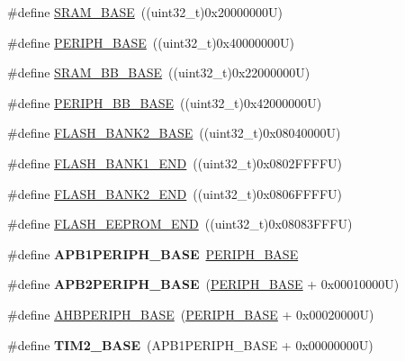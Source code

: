 \begin{DoxyCompactItemize}
\item 
\#define \hyperlink{group___peripheral__memory__map_ga05e8f3d2e5868754a7cd88614955aecc}{S\-R\-A\-M\-\_\-\-B\-A\-S\-E}~((uint32\-\_\-t)0x20000000\-U)
\item 
\#define \hyperlink{group___peripheral__memory__map_ga9171f49478fa86d932f89e78e73b88b0}{P\-E\-R\-I\-P\-H\-\_\-\-B\-A\-S\-E}~((uint32\-\_\-t)0x40000000\-U)
\item 
\#define \hyperlink{group___peripheral__memory__map_gad3548b6e2f017f39d399358f3ac98454}{S\-R\-A\-M\-\_\-\-B\-B\-\_\-\-B\-A\-S\-E}~((uint32\-\_\-t)0x22000000\-U)
\item 
\#define \hyperlink{group___peripheral__memory__map_gaed7efc100877000845c236ccdc9e144a}{P\-E\-R\-I\-P\-H\-\_\-\-B\-B\-\_\-\-B\-A\-S\-E}~((uint32\-\_\-t)0x42000000\-U)
\item 
\#define \hyperlink{group___peripheral__memory__map_ga289057b052162696849fef25b656d3d9}{F\-L\-A\-S\-H\-\_\-\-B\-A\-N\-K2\-\_\-\-B\-A\-S\-E}~((uint32\-\_\-t)0x08040000\-U)
\item 
\#define \hyperlink{group___peripheral__memory__map_ga443a2786535d83e32dfdc2b29e379332}{F\-L\-A\-S\-H\-\_\-\-B\-A\-N\-K1\-\_\-\-E\-N\-D}~((uint32\-\_\-t)0x0802\-F\-F\-F\-F\-U)
\item 
\#define \hyperlink{group___peripheral__memory__map_gab24a21b645aaab8737af5603c3d11e71}{F\-L\-A\-S\-H\-\_\-\-B\-A\-N\-K2\-\_\-\-E\-N\-D}~((uint32\-\_\-t)0x0806\-F\-F\-F\-F\-U)
\item 
\#define \hyperlink{group___peripheral__memory__map_gac8cb9b66893a7c4bdff3258909af027a}{F\-L\-A\-S\-H\-\_\-\-E\-E\-P\-R\-O\-M\-\_\-\-E\-N\-D}~((uint32\-\_\-t)0x08083\-F\-F\-F\-U)
\item 
\hypertarget{group___peripheral__memory__map_ga45666d911f39addd4c8c0a0ac3388cfb}{\#define {\bfseries A\-P\-B1\-P\-E\-R\-I\-P\-H\-\_\-\-B\-A\-S\-E}~\hyperlink{group___peripheral__memory__map_ga9171f49478fa86d932f89e78e73b88b0}{P\-E\-R\-I\-P\-H\-\_\-\-B\-A\-S\-E}}\label{group___peripheral__memory__map_ga45666d911f39addd4c8c0a0ac3388cfb}

\item 
\hypertarget{group___peripheral__memory__map_ga25b99d6065f1c8f751e78f43ade652cb}{\#define {\bfseries A\-P\-B2\-P\-E\-R\-I\-P\-H\-\_\-\-B\-A\-S\-E}~(\hyperlink{group___peripheral__memory__map_ga9171f49478fa86d932f89e78e73b88b0}{P\-E\-R\-I\-P\-H\-\_\-\-B\-A\-S\-E} + 0x00010000\-U)}\label{group___peripheral__memory__map_ga25b99d6065f1c8f751e78f43ade652cb}

\item 
\#define \hyperlink{group___peripheral__memory__map_ga92eb5d49730765d2abd0f5b09548f9f5}{A\-H\-B\-P\-E\-R\-I\-P\-H\-\_\-\-B\-A\-S\-E}~(\hyperlink{group___peripheral__memory__map_ga9171f49478fa86d932f89e78e73b88b0}{P\-E\-R\-I\-P\-H\-\_\-\-B\-A\-S\-E} + 0x00020000\-U)
\item 
\hypertarget{group___peripheral__memory__map_ga00d0fe6ad532ab32f0f81cafca8d3aa5}{\#define {\bfseries T\-I\-M2\-\_\-\-B\-A\-S\-E}~(A\-P\-B1\-P\-E\-R\-I\-P\-H\-\_\-\-B\-A\-S\-E + 0x00000000\-U)}\label{group___peripheral__memory__map_ga00d0fe6ad532ab32f0f81cafca8d3aa5}


\end{DoxyCompactItemize}
